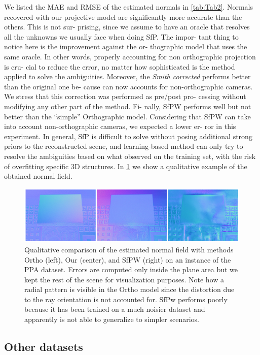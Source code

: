 \documentclass[letterpaper, 6 pt, journal, twoside]{IEEEtran}
\begin{document}
    We listed the MAE and RMSE of the estimated normals
in \cref{tab:Tab2}. Normals recovered with our projective model are
significantly more accurate than the others. This is not sur-
prising, since we assume to have an oracle that resolves all
the unknowns we usually face when doing SfP. The impor-
tant thing to notice here is the improvement against the or-
thographic model that uses the same oracle. In other words,
properly accounting for non orthographic projection is cru-
cial to reduce the error, no matter how sophisticated is the
method applied to solve the ambiguities. Moreover, the
\textit{Smith corrected} performs better than the original one be-
cause can now accounts for non-orthographic cameras. We
stress that this correction was performed as pre/post pro-
cessing without modifying any other part of the method. Fi-
nally, SfPW performs well but not better than the “simple”
Orthographic model. Considering that SfPW can take into
account non-orthographic cameras, we expected a lower er-
ror in this experiment. In general, SfP is difficult to solve
without posing additional strong priors to the reconstructed
scene, and learning-based method can only try to resolve
the ambiguities based on what observed on the training set,
with the risk of overfitting specific 3D structures. In \cref{fig:Fig4}
we show a qualitative example of the obtained normal field.

\begin{figure}
    \centering
    \includegraphics[width=18cm]{images/Figure_4.png} 
    \caption{Qualitative comparison of the estimated normal field with methods Ortho (left), Our (center), and SfPW (right) on an instance of the PPA dataset. Errors are computed only inside the plane area but we kept the rest of the scene for visualization purposes. Note how a radial pattern is visible in the Ortho model since the distortion due to the ray orientation is not accounted for. SfPw performs poorly because it has been trained on a much noisier dataset and apparently is not able to generalize to simpler scenarios.}
    \label{fig:Fig4}
\end{figure}


\subsection{Other datasets}
\end{document}
